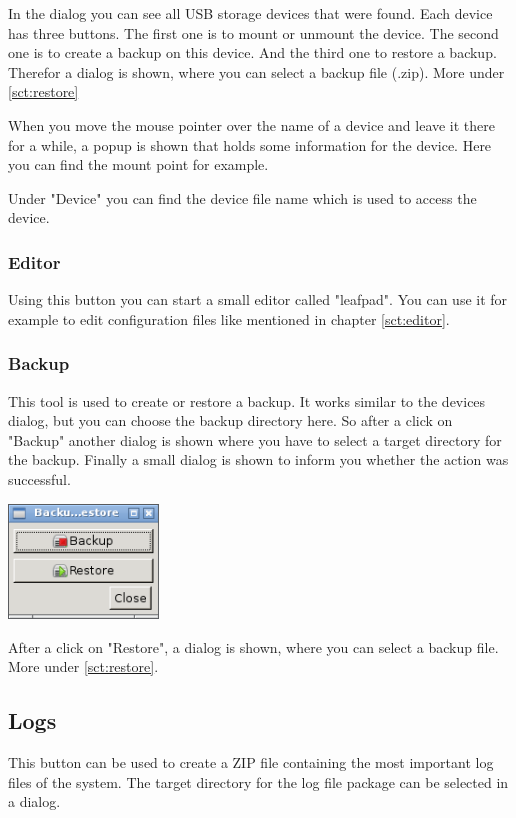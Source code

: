 \documentclass[a4paper,12pt,twoside]{article}
\begin{document}
In the dialog you can see all USB storage devices that were found. Each
device has three buttons. The first one is to mount or unmount the
device. The second one is to create a backup on this device. And the
third one to restore a backup. Therefor a dialog is shown, where you
can select a backup file (.zip). More under \ref{sct:restore}

When you move the mouse pointer over the name of a device and leave it
there for a while, a popup is shown that holds some information for the
device. Here you can find the mount point for example.

Under "Device" you can find the device file
name which is used to access the device.


\subsubsection{Editor}
\label{sct:gui_editor}
Using this button you can start a
small editor called "leafpad". You can use
it for example to edit configuration files like mentioned in chapter
\ref{sct:editor}.


\subsubsection{Backup}
\label{sct:dialog_backup}
This tool is used to create or restore
a backup. It works similar to the devices dialog, but you can choose
the backup directory here. So after a click on
"Backup" another dialog is shown where you
have to select a target directory for the backup. Finally a small
dialog is shown to inform you whether the action was successful.

\bigskip
\begin{minipage}{\linewidth}
    \centering
    \captionsetup{type=figure}
    \includegraphics[width=4cm]{screenshots/efaLiveen-img22.png}
    \label{fig:dialog_backp}
\end{minipage}
\bigskip

After a click on "Restore", a dialog is shown, where you can select a backup file.
More under \ref{sct:restore}.


\subsection{Logs}
\label{sct:logfiles}
This button can be used to create a ZIP file containing the most important log
files of the system. The target directory for the log file package can be selected
in a dialog.
\end{document}

